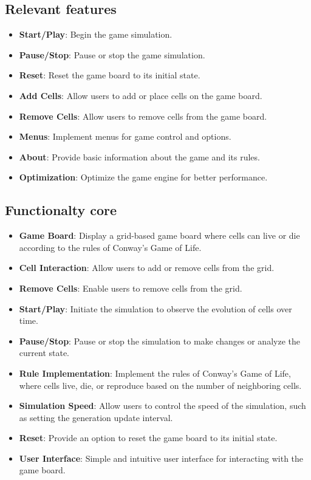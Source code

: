 \documentclass[12pt]{article}
\begin{document}
  \subsection*{Relevant features}
  \begin{itemize}
    \item \textbf{Start/Play}: Begin the game simulation.
    \item \textbf{Pause/Stop}: Pause or stop the game simulation.
    \item \textbf{Reset}: Reset the game board to its initial state.
    \item \textbf{Add Cells}: Allow users to add or place cells on the game board.
    \item \textbf{Remove Cells}: Allow users to remove cells from the game board.
    \item \textbf{Menus}: Implement menus for game control and options.
    \item \textbf{About}: Provide basic information about the game and its rules.
    \item \textbf{Optimization}: Optimize the game engine for better performance.
  \end{itemize}

  \subsection*{Functionalty core}
  \begin{itemize}
    \item \textbf{Game Board}: Display a grid-based game board where cells can live or die according to the rules of Conway's Game of Life.
    \item \textbf{Cell Interaction}: Allow users to add or remove cells from the grid.
    \item \textbf{Remove Cells}: Enable users to remove cells from the grid.
    \item \textbf{Start/Play}: Initiate the simulation to observe the evolution of cells over time.
    \item \textbf{Pause/Stop}: Pause or stop the simulation to make changes or analyze the current state.
    \item \textbf{Rule Implementation}: Implement the rules of Conway's Game of Life, where cells live, die, or reproduce based on the number of neighboring cells.
    \item \textbf{Simulation Speed}: Allow users to control the speed of the simulation, such as setting the generation update interval.
    \item \textbf{Reset}: Provide an option to reset the game board to its initial state.
    \item \textbf{User Interface}: Simple and intuitive user interface for interacting with the game board.
  \end{itemize}
\end{document}
